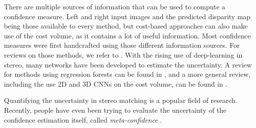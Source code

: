 There are multiple sources of information that can be used to compute a confidence measure. Left and right input images and the predicted disparity map being those available to every method, but cost-based approaches can also make use of the cost volume, as it contains a lot of useful information. Most confidence measures were first handcrafted using those different information sources. For reviews on those methods, we refer to \cite{egnal_stereo_2004, hu_quantitative_2012, poggi_quantitative_2017}. With the rising use of deep-learning in stereo, many networks have been developed to estimate the uncertainty. A review for methods using regression forests can be found in \cite{min-gyu_park_leveraging_2015}, and a more general review, including the use 2D and 3D CNNs on the cost volume, can be found in \cite{poggi_confidence_2021}.

\begin{remark}
     Quantifying the uncertainty in stereo matching is a popular field of research. Recently, people have even been trying to evaluate the uncertainty of the confidence estimation itself, called \textit{meta-confidence} \cite{kim_meta-confidence_2022}.
\end{remark}

